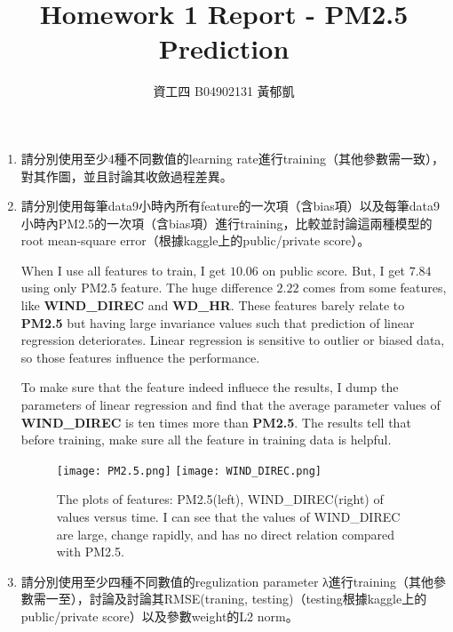 \documentclass[12pt, a4paper]{article}
\author{資工四 B04902131 黃郁凱}
\title{\vspace{-2cm} Homework 1 Report - PM2.5 Prediction}
\begin{document}
\maketitle

\begin{enumerate}
\item 請分別使用至少4種不同數值的learning rate進行training（其他參數需一致），對其作圖，並且討論其收斂過程差異。

\item 請分別使用每筆data9小時內所有feature的一次項（含bias項）以及每筆data9小時內PM2.5的一次項（含bias項）進行training，比較並討論這兩種模型的root mean-square error（根據kaggle上的public/private score）。\par
When I use all features to train, I get $10.06$ on public score. But, I get $7.84$ using only PM2.5 feature. The huge difference $2.22$ comes from some features, like \textbf{WIND\_DIREC} and \textbf{WD\_HR}. These features barely relate to \textbf{PM2.5} but having large invariance values such that prediction of linear regression deteriorates. Linear regression is sensitive to outlier or biased data, so those features influence the performance.\par
To make sure that the feature indeed influece the results, I dump the parameters of linear regression and find that the average parameter values of \textbf{WIND\_DIREC} is ten times more than \textbf{PM2.5}. The results tell that before training, make sure all the feature in training data is helpful.

\begin{figure}[H]
    \centering
    \texttt{[image: PM2.5.png]}
    \texttt{[image: WIND\_DIREC.png]}
    \caption{The plots of features: PM2.5(left), WIND\_DIREC(right) of values versus time. I can see that the values of WIND\_DIREC are large, change rapidly, and has no direct relation compared with PM2.5.}
\end{figure}

\item 請分別使用至少四種不同數值的regulization parameter λ進行training（其他參數需一至），討論及討論其RMSE(traning, testing)（testing根據kaggle上的public/private score）以及參數weight的L2 norm。


\end{enumerate}
\end{document}
